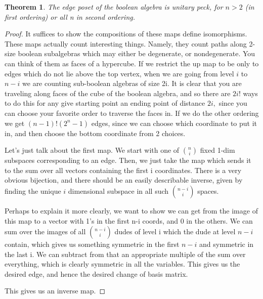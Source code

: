 \documentclass{amsart}
\newtheorem{thm}[subsubsection]{Theorem}
\begin{document}
\begin{thm}
The edge poset of the boolean algebra is unitary peck, for $n > 2$ (in first ordering) or all n in second ordering.
\end{thm}
\begin{proof}
It suffices to show the compositions of these maps define isomorphisms. These maps actually count interesting things. Namely, they count paths along 2-size boolean subalgebras which may either be degenerate, or nondegenerate. You can think of them as faces of a hypercube. If we restrict the up map to be only to edges which do not lie above the top vertex, when we are going from level $i$ to $n-i$ we are counting sub-boolean algebras of size 2i. It is clear that you are traveling along faces of the cube of the boolean algebra, and so there are $2i!$ ways to do this for any give starting point an ending point of distance $2i,$ since you can choose your favorite order to traverse the faces in. If we do the other ordering we get $(n-1)!(2^n-1)$ edges, since we can choose which coordinate to put it in, and then choose the bottom coordinate from 2 choices. 

Let's just talk about the first map. We start with one of $\binom n i$ fixed 1-dim subspaces corresponding to an edge. Then, we just take the map which sends it to the sum over all vectors containing the first i coordinates. There is a very obvious bijection, and there should be an easily describable inverse, given by finding the unique $i$ dimensional subspace in all such $\binom {n-i}i$ spaces.

Perhaps to explain it more clearly, we want to show we can get from the image of this map to a vector with 1's in the first n-i coords, and 0 in the others. We can sum over the images of all $\binom {n-i} i$ dudes of level i which the dude at level $n-i$ contain, which gives us something symmetric in the first $n-i$ and symmetric in the last i. We can subtract from that an appropriate multiple of the sum over everything, which is clearly symmetric in all the variables. This gives us the desired edge, and hence the desired change of basis matrix. 

This gives us an inverse map.
\end{proof}
\end{document}
